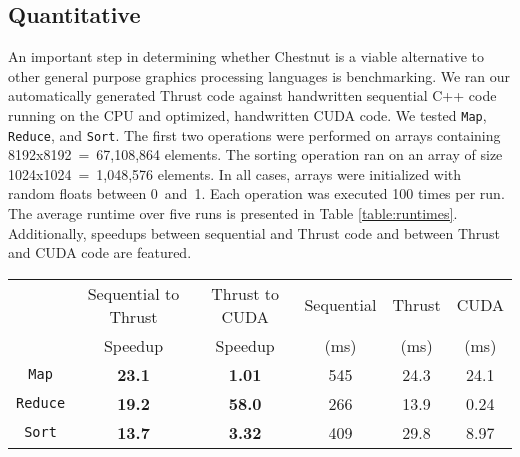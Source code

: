 \documentclass[twocolumn]{article}
\renewcommand{\|}{\origbar} %
\newcommand{\code}[1]{\texttt{#1}}
\begin{document}
\subsection{Quantitative}

An important step in determining whether Chestnut is a viable alternative to other general purpose graphics processing languages is benchmarking. We ran our automatically generated Thrust code against handwritten sequential C++ code running on the CPU and optimized, handwritten CUDA code. We tested \code{Map}, \code{Reduce}, and \code{Sort}. The first two operations were performed on arrays containing 8192x8192~=~67,108,864 elements. The sorting operation ran on an array of size 1024x1024~=~1,048,576 elements. In all cases, arrays were initialized with random floats between 0~and~1. Each operation was executed 100 times per run. The average runtime over five runs is presented in Table \ref{table:runtimes}. Additionally, speedups between sequential and Thrust code and between Thrust and CUDA code are featured.

\begin{table*}
  \centering
\begin{tabular}{| c || c|c || c|c|c |}
  \hline
                 & Sequential to Thrust & Thrust to CUDA & Sequential & Thrust & CUDA \\
                 &       Speedup                   &       Speedup             &    (ms)   &  (ms) & (ms) \\ \hline \hline
  \code{Map}     &  {\bf 23.1}                     & {\bf 1.01}                & 545       & 24.3  & 24.1 \\
  \code{Reduce}  &  {\bf 19.2}                     & {\bf 58.0}                & 266       & 13.9  & 0.24 \\
  \code{Sort}    &  {\bf 13.7}                     & {\bf 3.32}                & 409       & 29.8  & 8.97 \\ \hline
\end{tabular}
\caption{Runtime statistics comparing automatically generated Thrust code to Sequential code run on the CPU and optimized CUDA code. Map and Reduce were run on arrays containing 67,108,864 elements while Sort was run on 1,048,576 elements. Each operation was executed 100 times per run and the average runtime per operation is presented in milliseconds. Speedup in the first column is calculated as $\frac{sequential\; time}{Thrust\; time}$, the second column is $\frac{Thrust\; time}{CUDA\; time}$.}
\label{table:runtimes}
\end{table*}
\end{document}
